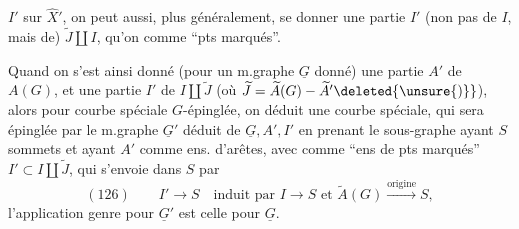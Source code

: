 $I'$ sur $\widehat X'$, on peut aussi, plus généralement, se donner une partie $I'$ (non pas de $I$, mais de) $\widetilde J\amalg I$, qu'on  comme ``pts marqués''.

Quand on s'est ainsi donné (pour un m.graphe $\underline G$ donné) une partie $A'$ de $A(G)$, et une partie $I'$ de $I\amalg\widetilde J$ (où $\widetilde J=\widetilde A(G)-\widetilde A'\deleted{\unsure{)}}$), alors pour  courbe spéciale $G$-épinglée, on déduit une courbe spéciale, qui sera épinglée par le m.graphe $\underline G'$ déduit de $\underline G,A',I'$ en prenant le sous-graphe  ayant  $S$ sommets et ayant $A'$ comme ens. d'arêtes, avec comme ``ens de pts marqués'' $I'\subset I\amalg\widetilde J$, qui s'envoie dans $S$  par
\[
(126)\qquad I'\longrightarrow S\quad\text{induit par }I\longrightarrow S\text{ et }\widetilde A(G)\xrightarrow{\text{origine}}S,
\]
l'application genre pour $\underline G'$ est celle pour $\underline G$.
